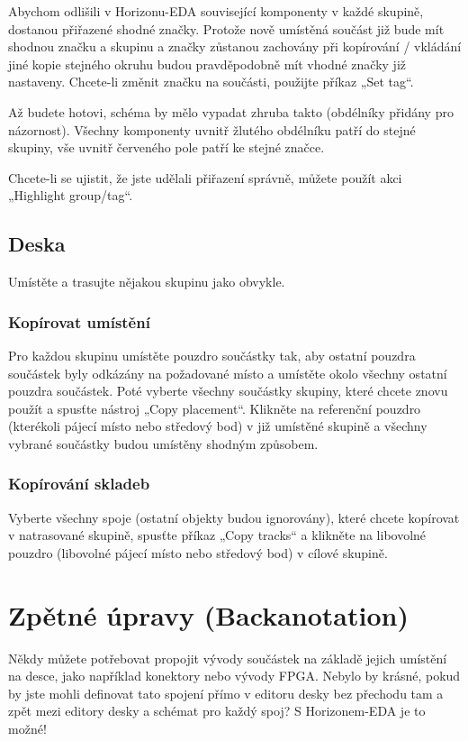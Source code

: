 \documentclass[letterpaper,10pt,czech]{sphinxmanual}
\begin{document}
Abychom odlišili v Horizonu-EDA související komponenty v každé skupině, dostanou přiřazené shodné značky. Protože nově umístěná součást již bude mít shodnou značku a skupinu a značky zůstanou zachovány při kopírování / vkládání jiné kopie stejného okruhu budou pravděpodobně mít vhodné značky již nastaveny. Chcete-li změnit značku na součásti, použijte příkaz „Set tag“.

Až budete hotovi, schéma by mělo vypadat zhruba takto (obdélníky přidány pro názornost). Všechny komponenty uvnitř žlutého obdélníku patří do stejné skupiny, vše uvnitř červeného pole patří ke stejné značce.

\noindent{}

Chcete-li se ujistit, že jste udělali přiřazení správně, můžete použít akci „Highlight group/tag“.


\section{Deska}
\label{\detokenize{copy-layout-placement:deska}}
Umístěte a trasujte nějakou skupinu jako obvykle.


\subsection{Kopírovat umístění}
\label{\detokenize{copy-layout-placement:kopirovat-umisteni}}
Pro každou skupinu umístěte pouzdro součástky tak, aby ostatní pouzdra součástek byly odkázány na požadované místo a umístěte okolo všechny ostatní pouzdra součástek. Poté vyberte všechny součástky skupiny, které chcete znovu použít a spusťte nástroj „Copy placement“. Klikněte na referenční pouzdro (kterékoli pájecí místo nebo středový bod) v již umístěné skupině a všechny vybrané součástky budou umístěny shodným způsobem.


\subsection{Kopírování skladeb}
\label{\detokenize{copy-layout-placement:kopirovani-skladeb}}
Vyberte všechny spoje (ostatní objekty budou ignorovány), které chcete kopírovat
v natrasované skupině, spusťte příkaz „Copy tracks“ a klikněte na libovolné pouzdro
(libovolné pájecí místo nebo středový bod) v cílové skupině.


\chapter{Zpětné úpravy (Backanotation)}
\label{\detokenize{backannotation:zpetne-upravy-backanotation}}\label{\detokenize{backannotation::doc}}
Někdy můžete potřebovat propojit vývody součástek na základě jejich
umístění na desce, jako například konektory nebo vývody FPGA. Nebylo by krásné, pokud by jste mohli definovat tato spojení přímo v editoru desky bez přechodu tam a zpět mezi editory desky a  schémat pro každý spoj? S Horizonem-EDA je to možné!
\end{document}
